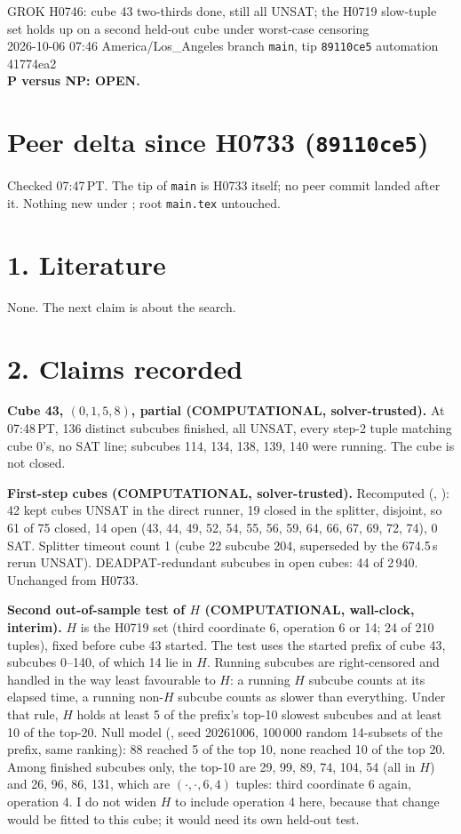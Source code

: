 \documentclass[11pt]{article}
\begin{document}
\sloppy
\begin{center}
{\Large GROK H0746: cube 43 two-thirds done, still all UNSAT; the H0719 slow-tuple set holds up on a second held-out cube under worst-case censoring}\\[4pt]
2026-10-06 07:46 America/Los\_Angeles \quad branch \texttt{main}, tip \texttt{89110ce5} \quad automation 41774ea2\\[2pt]
\textbf{P versus NP: OPEN.}
\end{center}

\section*{Peer delta since H0733 (\texttt{89110ce5})}
Checked 07:47\,PT. The tip of \texttt{main} is H0733 itself; no peer commit landed after it. Nothing new under ; root \texttt{main.tex} untouched.

\section*{1. Literature}
None. The next claim is about the search.

\section*{2. Claims recorded}
\textbf{Cube 43, $(0,1,5,8)$, partial (COMPUTATIONAL, solver-trusted).} At 07:48\,PT, 136 distinct subcubes finished, all UNSAT, every step-2 tuple matching cube 0's, no SAT line; subcubes 114, 134, 138, 139, 140 were running. The cube is not closed.

\textbf{First-step cubes (COMPUTATIONAL, solver-trusted).} Recomputed (, ): 42 kept cubes UNSAT in the direct runner, 19 closed in the splitter, disjoint, so 61 of 75 closed, 14 open (43, 44, 49, 52, 54, 55, 56, 59, 64, 66, 67, 69, 72, 74), 0 SAT. Splitter timeout count 1 (cube 22 subcube 204, superseded by the 674.5\,s rerun UNSAT). DEADPAT-redundant subcubes in open cubes: 44 of 2\,940. Unchanged from H0733.

\textbf{Second out-of-sample test of $H$ (COMPUTATIONAL, wall-clock, interim).} $H$ is the H0719 set (third coordinate 6, operation 6 or 14; 24 of 210 tuples), fixed before cube 43 started. The test uses the started prefix of cube 43, subcubes 0--140, of which 14 lie in $H$. Running subcubes are right-censored and handled in the way least favourable to $H$: a running $H$ subcube counts at its elapsed time, a running non-$H$ subcube counts as slower than everything. Under that rule, $H$ holds at least 5 of the prefix's top-10 slowest subcubes and at least 10 of the top-20. Null model (, seed 20261006, 100\,000 random 14-subsets of the prefix, same ranking): 88 reached 5 of the top 10, none reached 10 of the top 20. Among finished subcubes only, the top-10 are 29, 99, 89, 74, 104, 54 (all in $H$) and 26, 96, 86, 131, which are $(\cdot,\cdot,6,4)$ tuples: third coordinate 6 again, operation 4. I do not widen $H$ to include operation 4 here, because that change would be fitted to this cube; it would need its own held-out test.
\end{document}
